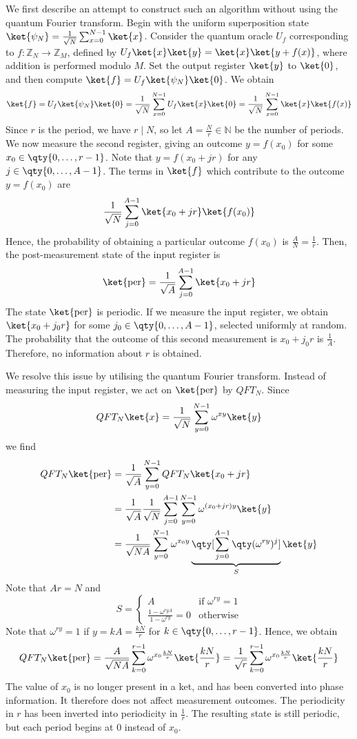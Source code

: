 We first describe an attempt to construct such an algorithm without using the quantum Fourier transform.
Begin with the uniform superposition state $\ket{\psi_N} = \frac{1}{\sqrt{N}} \sum_{x=0}^{N-1} \ket{x}$.
Consider the quantum oracle $U_f$ corresponding to $f \colon \mathbb Z_N \to \mathbb Z_M$, defined by $U_f \ket{x} \ket{y} = \ket{x} \ket{y + f(x)}$, where addition is performed modulo $M$.
Set the output register $\ket{y}$ to $\ket{0}$, and then compute $\ket{f} = U_f \ket{\psi_N} \ket{0}$.
We obtain
\[ \ket{f} = U_f \ket{\psi_N} \ket{0} = \frac{1}{\sqrt{N}} \sum_{x=0}^{N-1} U_f \ket{x} \ket{0} = \frac{1}{\sqrt{N}} \sum_{x=0}^{N-1} \ket{x} \ket{f(x)} \]
Since $r$ is the period, we have $r \mid N$, so let $A = \frac{N}{r} \in \mathbb N$ be the number of periods.
We now measure the second register, giving an outcome $y = f(x_0)$ for some $x_0 \in \qty{0, \dots, r-1}$.
Note that $y = f(x_0 + jr)$ for any $j \in \qty{0, \dots, A-1}$.
The terms in $\ket{f}$ which contribute to the outcome $y = f(x_0)$ are
\[ \frac{1}{\sqrt{N}} \sum_{j=0}^{A-1} \ket{x_0 + jr} \ket{f(x_0)} \]
Hence, the probability of obtaining a particular outcome $f(x_0)$ is $\frac{A}{N} = \frac{1}{r}$.
Then, the post-measurement state of the input register is
\[ \ket{\text{per}} = \frac{1}{\sqrt{A}} \sum_{j=0}^{A-1} \ket{x_0 + jr} \]
The state $\ket{\text{per}}$ is periodic.
If we measure the input register, we obtain $\ket{x_0 + j_0 r}$ for some $j_0 \in \qty{0, \dots, A-1}$, selected uniformly at random.
The probability that the outcome of this second measurement is $x_0 + j_0 r$ is $\frac{1}{A}$.
Therefore, no information about $r$ is obtained.

We resolve this issue by utilising the quantum Fourier transform.
Instead of measuring the input register, we act on $\ket{\text{per}}$ by $QFT_N$.
Since
\[ QFT_N\ket{x} = \frac{1}{\sqrt{N}}\sum_{y=0}^{N-1}\omega^{xy} \ket{y} \]
we find
\begin{align*}
    QFT_N \ket{\text{per}} &= \frac{1}{\sqrt{A}}\sum_{y=0}^{N-1} QFT_N \ket{x_0 + jr} \\
    &= \frac{1}{\sqrt{A}} \frac{1}{\sqrt{N}} \sum_{j=0}^{A-1} \sum_{y=0}^{N-1} \omega^{(x_0 + jr)y} \ket{y} \\
    &= \frac{1}{\sqrt{NA}} \sum_{y=0}^{N-1} \omega^{x_0 y} \underbrace{\qty[\sum_{j=0}^{A-1} \qty(\omega^{ry})^j]}_S \ket{y}
\end{align*}
Note that $Ar = N$ and
\[ S = \begin{cases}
    A & \text{if } \omega^{ry} = 1 \\
    \frac{1 - \omega^{ryA}}{1 - \omega^{ry}} = 0 & \text{otherwise}
\end{cases} \]
Note that $\omega^{ry} = 1$ if $y = kA = \frac{kN}{r}$ for $k \in \qty{0, \dots, r - 1}$.
Hence, we obtain
\[ QFT_N \ket{\text{per}} = \frac{A}{\sqrt{NA}} \sum_{k=0}^{r-1} \omega^{x_0 \frac{kN}{r}} \ket{\frac{kN}{r}} = \frac{1}{\sqrt{r}} \sum_{k=0}^{r-1} \omega^{x_0 \frac{kN}{r}} \ket{\frac{kN}{r}} \]
The value of $x_0$ is no longer present in a ket, and has been converted into phase information.
It therefore does not affect measurement outcomes.
The periodicity in $r$ has been inverted into periodicity in $\frac{1}{r}$.
The resulting state is still periodic, but each period begins at 0 instead of $x_0$.

